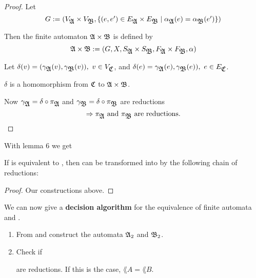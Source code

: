 \begin{proof}
Let \[ G := (V_{\mbox{$\mathfrak{A}$}} \times V_{\mbox{$\mathfrak{B}$}}, \mbox{$\{(e, e') \in E_{\mbox{$\mathfrak{A}$}} \times
E_{\mbox{$\mathfrak{B}$}} \mid \alpha_{\mbox{$\mathfrak{A}$}}(e) = \alpha_{\mbox{$\mathfrak{B}$}}(e')\}$}  ) \]

Then the finite automaton $\mbox{$\mathfrak{A}$} \times \mbox{$\mathfrak{B}$}$ is defined by
\[ \mbox{$\mathfrak{A}$} \times \mbox{$\mathfrak{B}$} := (G, X, S_{\mbox{$\mathfrak{A}$}} \times S_{\mbox{$\mathfrak{B}$}}, F_{\mbox{$\mathfrak{A}$}}
\times F_{\mbox{$\mathfrak{B}$}}, \alpha) \]

Let $\delta(v) = (\gamma_{\mbox{$\mathfrak{A}$}}(v), \gamma_{\mbox{$\mathfrak{B}$}}(v)),\ v \in V_{\mbox{$\mathfrak{C}$}}$,
and $\delta(e) = \gamma_{\mbox{$\mathfrak{A}$}}(e), \gamma_{\mbox{$\mathfrak{B}$}}(e)),\ e \in E_{\mbox{$\mathfrak{C}$}}$.

$\delta$ is a homomorphism from $\mbox{$\mathfrak{C}$}$ to $\mbox{$\mathfrak{A}$} \times \mbox{$\mathfrak{B}$}$.

Now $\gamma_{\mbox{$\mathfrak{A}$}} = \delta \circ \pi_{\mbox{$\mathfrak{A}$}}$ and $\gamma_{\mbox{$\mathfrak{B}$}} = \delta
\circ \pi_{\mbox{$\mathfrak{B}$}}$ are reductions
\[ \Rightarrow \pi_{\mbox{$\mathfrak{A}$}} \mbox{ and } \pi_{\mbox{$\mathfrak{B}$}} \mbox{ are reductions.} \]
\end{proof}

With lemma 6 we get

\begin{theorem}
If  is equivalent to , then  can be transformed into  by
the following chain of reductions:
\begin{center}
\end{center}
\end{theorem}

\begin{proof}
Our constructions above.
\end{proof}

We can now give a {\bf decision algorithm} for the equivalence of finite
automata  and .

\begin{enumerate}
  \item From  and  construct the automata $\mbox{$\mathfrak{A}$}_2$ and $\mbox{$\mathfrak{B}$}_2$.
  \item Check if 
	are reductions. If this is the case, $\lang{A} = \lang{B}$.
\end{enumerate}

